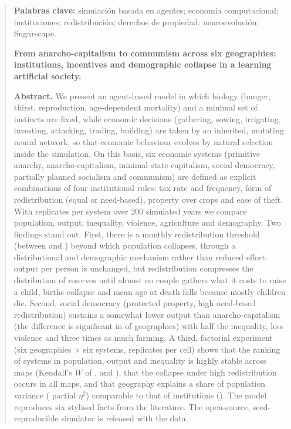 \documentclass[11pt,a4paper]{article}
\begin{document}
\begin{abstract}
\medskip\noindent\textbf{Palabras clave:} simulación basada en agentes; economía computacional; instituciones; redistribución; derechos de propiedad; neuroevolución; Sugarscape.

\medskip\noindent\textbf{From anarcho-capitalism to communism across six geographies: institutions, incentives and demographic collapse in a learning artificial society.}

\noindent\textbf{Abstract.} We present an agent-based model in which biology (hunger, thirst, reproduction, age-dependent mortality) and a minimal set of instincts are fixed, while economic decisions (gathering, sowing, irrigating, investing, attacking, trading, building) are taken by an inherited, mutating neural network, so that economic behaviour evolves by natural selection inside the simulation. On this basis, six economic systems (primitive anarchy, anarcho-capitalism, minimal-state capitalism, social democracy, partially planned socialism and communism) are defined as explicit combinations of four institutional rules: tax rate and frequency, form of redistribution (equal or need-based), property over crops and ease of theft. With \nReplicas{} replicates per system over 200 simulated years we compare population, output, inequality, violence, agriculture and demography. Two findings stand out. First, there is a monthly redistribution threshold (between \umbralImpuestoPrevio{} and \umbralImpuesto{}) beyond which population collapses, through a distributional and demographic mechanism rather than reduced effort: output per person is unchanged, but redistribution compresses the distribution of reserves until almost no couple gathers what it costs to raise a child, births collapse and mean age at death falls because mostly children die. Second, social democracy (protected property, high need-based redistribution) sustains a somewhat lower output than anarcho-capitalism (the difference is significant in \mapasSocdemProdMenor{} of \nMapas{} geographies) with half the inequality, less violence and three times as much farming. A third, factorial experiment (six geographies $\times$ six systems, \nRepMapas{} replicates per cell) shows that the ranking of systems in population, output and inequality is highly stable across maps (Kendall's $W$ of \kendallPob{}, \kendallProd{} and \kendallGini), that the collapse under high redistribution occurs in all \nMapas{} maps, and that geography explains a share of population variance (\etaPobMapa{} partial $\eta^2$) comparable to that of institutions (\etaPobSistema). The model reproduces six stylised facts from the literature. The open-source, seed-reproducible simulator is released with the data.
\end{abstract}
\end{document}
